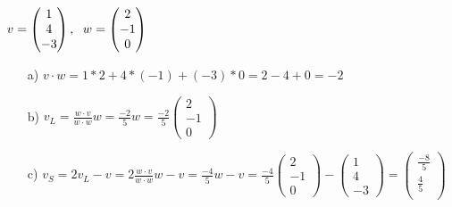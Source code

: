 \subsection{}
\begin{math}
    v
    =\begin{pmatrix}
        1\\
        4\\
        -3
    \end{pmatrix},
    \hspace{6px}
    w
    =\begin{pmatrix}
        2\\
        -1\\
        0
    \end{pmatrix}
\end{math}
\begin{enumerate}
    \item[a)]
        \begin{math}
            v\cdot w
            =1*2+4*(-1)+(-3)*0
            =2-4+0
            =-2
        \end{math}
    \item[b)]
        \begin{math}
            v_{L}
            =\frac{w\cdot v}{w\cdot w}w
            =\frac{-2}{5}w
            =\frac{-2}{5}\begin{pmatrix}
                2\\
                -1\\
                0
            \end{pmatrix}
        \end{math}
    \item[c)]
        \begin{math}
            v_{S}
            =2v_{L}-v
            =2\frac{w\cdot v}{w\cdot w}w-v
            =\frac{-4}{5}w-v
            =\frac{-4}{5}\begin{pmatrix}
                2\\
                -1\\
                0
            \end{pmatrix}-\begin{pmatrix}
                1\\
                4\\
                -3
            \end{pmatrix}
            =\begin{pmatrix}
                \frac{-8}{5}\\
                \frac{4}{5}\\

\end{pmatrix}
\end{math}
\end{enumerate}
